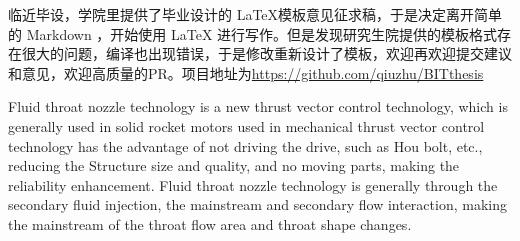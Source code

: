 \begin{zhabstract}
 临近毕设，学院里提供了毕业设计的 \LaTeX{}模板意见征求稿，于是决定离开简单的 Markdown ，开始使用 \LaTeX{} 进行写作。但是发现研究生院提供的模板格式存在很大的问题，编译也出现错误，于是修改重新设计了模板，欢迎再欢迎提交建议和意见，欢迎高质量的PR。项目地址为\url{https://github.com/qiuzhu/BITthesis}
 
\end{zhabstract}


\begin{enabstract}
 Fluid throat nozzle technology is a new thrust vector control technology, which is generally used in solid rocket motors used in mechanical thrust vector control technology has the advantage of not driving the drive, such as Hou bolt, etc., reducing the Structure size and quality, and no moving parts, making the reliability enhancement. Fluid throat nozzle technology is generally through the secondary fluid injection, the mainstream and secondary flow interaction, making the mainstream of the throat flow area and throat shape changes.
 
 
\end{enabstract}

